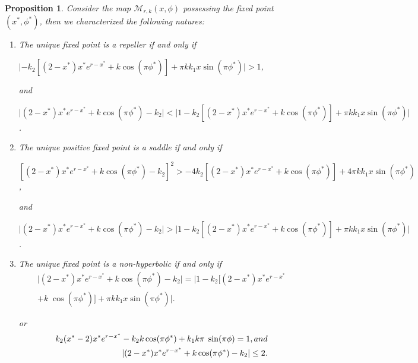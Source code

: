 \documentclass{article}
\newtheorem{proposition}[theorem]{Proposition}
\begin{document}
\vspace{0.2cm}
\begin{proposition}
Consider the map $\mathcal{M}_{r,k}(x,\phi)$ possessing the fixed point $(x^*,\phi^*)$, then we characterized the following natures:
    \begin{enumerate}
        \item The unique fixed point is a repeller if and only if
        
        $\lvert -k_2[(2-x^{*})x^{*}e^{r-x^{*}}+k \cos(\pi\phi^*)]+{\pi}k{k_1}x \sin({\pi}\phi^*) \rvert >1$,
 
\noindent and 
  
        $\lvert (2-x^{*})x^{*}e^{r-x^{*}}+k \cos(\pi\phi^*)-k_2 \rvert <\lvert 1-k_2[(2-x^{*})x^{*}e^{r-x^{*}}+k \cos(\pi\phi^*)]+{\pi}k{k_1}x \sin({\pi}\phi^*) \rvert $.

        \item The unique positive fixed point is a saddle if and only if 

        $[(2-x^{*})x^{*}e^{r-x^{*}}+k \cos(\pi\phi^*)-k_2]^2>-4k_2[(2-x^{*})x^{*}e^{r-x^{*}}+k \cos(\pi\phi^*)]+4{\pi}k{k_1}x \sin({\pi}\phi^*)$,
        
      \noindent  and

       $\lvert (2-x^{*})x^{*}e^{r-x^{*}}+k \cos(\pi\phi^*)-k_2 \rvert > \lvert 1-k_2[(2-x^{*})x^{*}e^{r-x^{*}}+k \cos(\pi\phi^*)]+{\pi}k{k_1}x \sin({\pi}\phi^*) \rvert $.
        \item The  unique fixed point is a non-hyperbolic if and only if 
\begin{equation}\label{saddle_c1}
\begin{split}
    \lvert (2-x^{*})x^{*}e^{r-x^{*}}+k \cos(\pi\phi^*)-k_2 \rvert =\lvert  1-k_2[(2-x^{*})x^{*}e^{r-x^{*}}\\
    +k\;\cos(\pi\phi^*)]+{\pi}k{k_1}x \sin({\pi}\phi^*)\rvert. 
    \end{split}
\end{equation}
       

\noindent        or
        \begin{equation}\label{saddle_c2}
        \begin{split}
              k_2(x^*-2)x^*e^{r-x^*}-k_2k \cos(\pi\phi^*)+k_1k\pi\;\sin(\pi\phi)=1,\vspace{0.3cm} and \\
         \lvert (2-x^*)x^*e^{r-x^*}+k \cos(\pi\phi^*)-k_2 \rvert \leq 2.
         \end{split}
\end{equation} 
        
    \end{enumerate}
\end{proposition}
\end{document}
